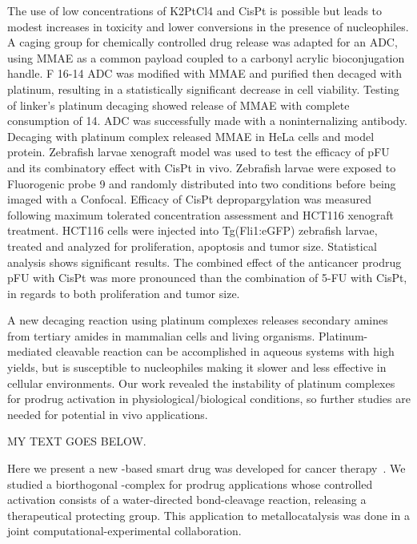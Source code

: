 The use of low concentrations of K2PtCl4 and CisPt is possible but leads to modest increases in toxicity and lower conversions in the presence of nucleophiles.
A caging group for chemically controlled drug release was adapted for an ADC, using MMAE as a common payload coupled to a carbonyl acrylic bioconjugation handle.
F 16-14 ADC was modified with MMAE and purified then decaged with platinum, resulting in a statistically significant decrease in cell viability.
Testing of linker's platinum decaging showed release of MMAE with complete consumption of 14.
ADC was successfully made with a noninternalizing antibody.
Decaging with platinum complex released MMAE in HeLa cells and model protein.
Zebrafish larvae xenograft model was used to test the efficacy of pFU and its combinatory effect with CisPt in vivo.
Zebrafish larvae were exposed to Fluorogenic probe 9 and randomly distributed into two conditions before being imaged with a Confocal.
Efficacy of CisPt depropargylation was measured following maximum tolerated concentration assessment and HCT116 xenograft treatment.
HCT116 cells were injected into Tg(Fli1:eGFP) zebrafish larvae, treated and analyzed for proliferation, apoptosis and tumor size.
Statistical analysis shows significant results.
The combined effect of the anticancer prodrug pFU with CisPt was more pronounced than the combination of 5-FU with CisPt, in regards to both proliferation and tumor size.

A new decaging reaction using platinum complexes releases secondary amines from tertiary amides in mammalian cells and living organisms.
Platinum-mediated cleavable reaction can be accomplished in aqueous systems with high yields, but is susceptible to nucleophiles making it slower and less effective in cellular environments.
Our work revealed the instability of platinum complexes for prodrug activation in physiological/biological conditions, so further studies are needed for potential in vivo applications.

MY TEXT GOES BELOW.

Here we present a new -based smart drug was developed for cancer therapy~\cite{Oliveira_2020}.
We studied a biorthogonal -complex for prodrug applications whose controlled activation consists
of a water-directed bond-cleavage reaction, releasing a therapeutical protecting group.
This application to metallocatalysis was done in a joint computational-experimental collaboration.

